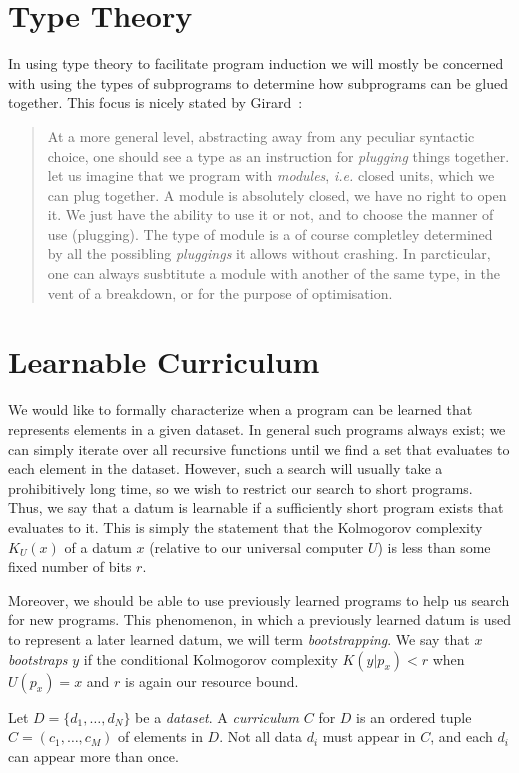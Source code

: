 \documentclass{article}
\begin{document}
\section{Type Theory}
In using type theory to facilitate program induction we will mostly be
concerned with using the types of subprograms to determine how
subprograms can be glued together. This focus is nicely stated by Girard~\cite{girard1989proofs}:

\begin{quote}
At a more general level, abstracting away from any peculiar syntactic
choice, one should see a type as an instruction for \emph{plugging}
things together. let us imagine that we program with \emph{modules},
\emph{i.e.} closed units, which we can plug together. A module is
absolutely closed, we have no right to open it. We just have the
ability to use it or not, and to choose the manner of use
(plugging). The type of module is a of course completley determined by
all the possibling \emph{pluggings} it allows without crashing. In
parcticular, one can always susbtitute a module with another of the
same type, in the vent of a breakdown, or for the purpose of
optimisation.
\end{quote}

\section{Learnable Curriculum}
We would like to formally characterize when a program can be learned
that represents elements in a given dataset. In general such programs
always exist; we can simply iterate over all recursive functions until
we find a set that evaluates to each element in the dataset. However,
such a search will usually take a prohibitively long time, so we wish
to restrict our search to short programs.  Thus, we say that a datum
is learnable if a sufficiently short program exists that evaluates to
it. This is simply the statement that the Kolmogorov complexity
$K_U(x)$ of a datum $x$ (relative to our universal computer $U$) is
less than some fixed number of bits $r$. 

Moreover, we should be able to use previously learned programs to help
us search for new programs. This phenomenon, in which a previously
learned datum is used to represent a later learned datum, we will term
\emph{bootstrapping}. We say that $x$ \emph{bootstraps} $y$ if the
conditional Kolmogorov complexity $K(y | p_x) < r$ when $U(p_x) = x$ and
$r$ is again our resource bound. 

Let $D= \{d_1, \dots, d_N\}$ be a \emph{dataset}. A \emph{curriculum}
$C$ for $D$ is an ordered tuple $C = (c_1, \dots, c_M)$ of elements in
$D$. Not all data $d_i$ must appear in $C$, and each $d_i$ can appear
more than once.
\end{document}
